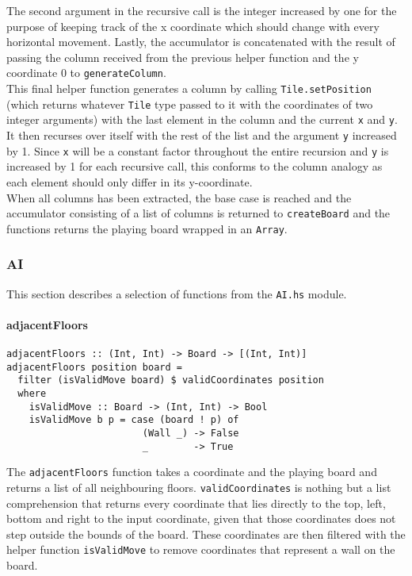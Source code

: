 \documentclass{article}
\begin{document}
 \newline
The second argument in the recursive call is the integer increased by one for the purpose of keeping track of the x coordinate which should change with every horizontal movement. Lastly, the accumulator is concatenated with the result of passing the column received from the previous helper function and the y coordinate 0 to \texttt{generateColumn}.\\
\newline
This final helper function generates a column by calling \texttt{Tile.setPosition} (which returns whatever \texttt{Tile} type passed to it with the coordinates of two integer arguments) with the last element in the column and the current \texttt{x} and \texttt{y}. It then recurses over itself with the rest of the list and the argument \texttt{y} increased by 1. Since \texttt{x} will be a constant factor throughout the entire recursion and \texttt{y} is increased by 1 for each recursive call, this conforms to the column analogy as each element should only differ in its y-coordinate.\\
\newline
When all columns has been extracted, the base case is reached and the accumulator consisting of a list of columns is returned to \texttt{createBoard} and the functions returns the playing board wrapped in an \texttt{Array}.
\newpage
        \subsubsection{AI}
        This section describes a selection of functions from the \texttt{AI.hs} module.
        \paragraph{adjacentFloors}
   \begin{verbatim}
adjacentFloors :: (Int, Int) -> Board -> [(Int, Int)]
adjacentFloors position board =
  filter (isValidMove board) $ validCoordinates position
  where
    isValidMove :: Board -> (Int, Int) -> Bool
    isValidMove b p = case (board ! p) of
                        (Wall _) -> False
                        _        -> True
   \end{verbatim}
The \texttt{adjacentFloors} function takes a coordinate and the playing board and returns a list of all neighbouring floors. \texttt{validCoordinates} is nothing but a list comprehension that returns every coordinate that lies directly to the top, left, bottom and right to the input coordinate, given that those coordinates does not step outside the bounds of the board. These coordinates are then filtered with the helper function \texttt{isValidMove} to remove coordinates that represent a wall on the board.
\end{document}
